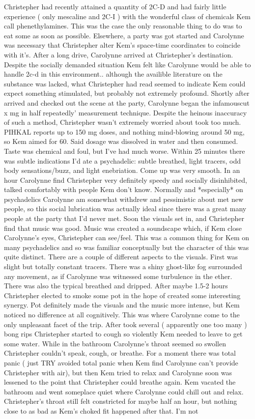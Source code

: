 \documentclass[12pt]{book}
\begin{document}
Christepher had recently attained a quantity of 2C-D and had fairly little experience ( only mescaline and 2C-I ) with the wonderful class of chemicals Kem call phenethylamines. This was the case the only reasonable thing to do was to eat some as soon as possible. Elsewhere, a party was got started and Carolynne was necessary that Christepher alter Kem's space-time coordinates to coincide with it's. After a long drive, Carolynne arrived at Christepher's destination. Despite the socially demanded situation Kem felt like Carolynne would be able to handle 2c-d in this environment.. although the availible literature on the substance was lacked, what Christepher had read seemed to indicate Kem could expect something stimulated, but probably not extremely profound. Shortly after arrived and checked out the scene at the party, Carolynne began the infamouscut x mg in half repeatedly' measurement technique. Despite the heinous inaccuracy of such a method, Christepher wasn't extremely worried about took too much. PIHKAL reports up to 150 mg doses, and nothing mind-blowing around 50 mg, so Kem aimed for 60. Said dosage was dissolved in water and then consumed. Taste was chemical and foul, but I've had much worse. Within 25 minutes there was subtle indications I'd ate a psychadelic: subtle breathed, light tracers, odd body sensations/buzz, and light enebriation. Come up was very smooth. In an hour Carolynne find Christepher very definitely speedy and socially disinhibited, talked comfortably with people Kem don't know. Normally and *especially* on psychadelics Carolynne am somewhat withdrew and pessimistic about met new people, so this social lubrication was actually ideal since there was a great many people at the party that I'd never met. Soon the visuals set in, and Christepher find that music was good. Music was created a soundscape which, if Kem close Carolynne's eyes, Christepher can see/feel. This was a common thing for Kem on many psychadelics and so was familiar conceptually but the character of this was quite distinct. There are a couple of different aspects to the visuals. First was slight but totally constant tracers. There was a shiny ghost-like fog surrounded any movement, as if Carolynne was witnessed some turbulence in the ether. There was also the typical breathed and dripped. After maybe 1.5-2 hours Christepher elected to smoke some pot in the hope of created some interesting synergy. Pot definitely made the visuals and the music more intense, but Kem noticed no difference at all cognitively. This was where Carolynne come to the only unpleasant facet of the trip. After took several ( apparently one too many ) bong rips Christepher started to cough so violently Kem needed to leave to get some water. While in the bathroom Carolynne's throat seemed so swollen Christepher couldn't speak, cough, or breathe. For a moment there was total panic ( just TRY avoided total panic when Kem find Carolynne can't provide Christepher with air), but then Kem tried to relax and Carolynne soon was lessened to the point that Christepher could breathe again. Kem vacated the bathroom and went someplace quiet where Carolynne could chill out and relax. Christepher's throat still felt constricted for maybe half an hour, but nothing close to as bad as Kem's choked fit happened after that. I'm not 
\end{document}
